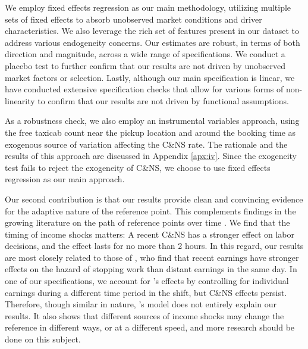 \documentclass[reviewmode,AEJ]{AEA}
\begin{document}
We employ fixed effects regression as our main methodology, utilizing multiple sets of fixed effects 
to absorb unobserved market conditions and driver characteristics. We also leverage the rich set of 
features present in our dataset to address various endogeneity concerns. Our estimates are robust, 
in terms of both direction and magnitude, across a wide range of specifications. We conduct a placebo 
test to further confirm that our results are not driven by unobserved market factors or selection. Lastly, 
although our main specification is linear, we have conducted extensive specification checks that allow for
various forms of non-linearity to confirm that our results are not driven by functional assumptions.

As a robustness check, we also employ an instrumental variables approach, using the free taxicab count near 
the pickup location and around the booking time as exogenous source of variation affecting the C\&NS rate.
The rationale and the results of this approach are discussed in Appendix \ref{apx:iv}. 
Since the exogeneity test fails to reject the exogeneity of C\&NS, 
we choose to use fixed effects regression as our main approach.




Our second contribution is that our results provide clean and convincing evidence for the adaptive nature
of the reference point. This complements findings in the growing literature on the path of reference points
over time \citep{dellavigna2017reference,thakral2018daily}. We find that the timing of income shocks matters:
A recent C\&NS has a stronger effect on labor decisions, and the effect lasts for no more than 2 hours. 
In this regard, our results are most closely related to those of \citet{thakral2018daily}, who find that 
recent earnings have stronger effects on the hazard of stopping work than distant earnings in the same day.
In one of our specifications, we account for \citeauthor{thakral2018daily}'s effects by controlling for
individual earnings during a different time period in the shift, but C\&NS effects persist. Therefore,
though similar in nature, \citeauthor{thakral2018daily}'s model does not entirely explain our results. 
It also shows that different sources of income shocks may change the reference in different ways, or at
a different speed, and more research should be done on this subject.
\end{document}
